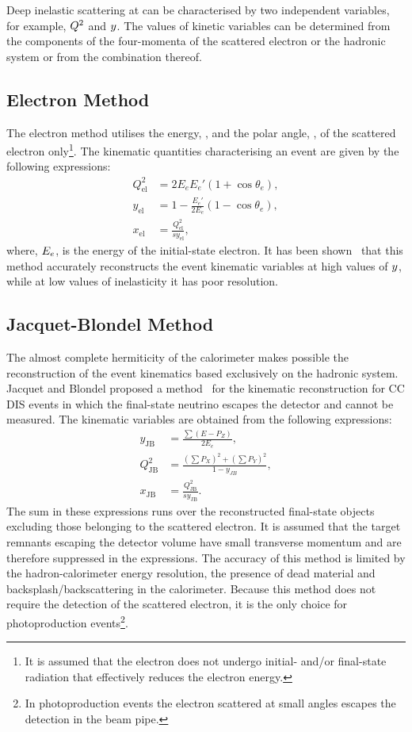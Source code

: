 Deep inelastic scattering at \hera can be characterised by two independent variables, for example, $\mbox{${Q^2}$}$ and $\mbox{${y}$}$. The values of kinetic variables can be determined from the components of the four-momenta of the scattered electron or the hadronic system or from the combination thereof.
\subsection{Electron Method}
\label{subsec:em}
The electron method utilises the energy, \eefin, and the polar angle, \thetae, of the scattered electron only\footnote{It is assumed that the electron does not undergo initial- and/or final-state radiation that effectively reduces the electron energy.}. The kinematic quantities characterising an event are given by the following expressions:
\begin{align}
	Q^2_\text{el} &= 2 E_e E_e' \left( 1 + \cos \theta_e \right),			\label{eq:q2el}							\\
	y_\text{el}      &= 1 - \frac{E_e'}{2 E_e}\left( 1 - \cos \theta_e \right),			\label{eq:yel} \\
	x_\text{el}      &= \frac{Q^2_\text{el}}{s y_\text{el}},			\label{eq:xel}
\end{align}
where, $\mbox{$E_e$}$, is the energy of the initial-state electron. It has been shown~\cite{nim:a426:583} that this method accurately reconstructs the event kinematic variables at high values of $\mbox{${y}$}$, while at low values of inelasticity it has poor resolution.
\subsection{Jacquet-Blondel Method}
\label{subsec:jb}
The almost complete hermiticity of the \zeus calorimeter makes  possible the reconstruction of the event kinematics based exclusively on the hadronic system. Jacquet and Blondel proposed a method~\cite{proc:epfacility:1979:391} for the kinematic reconstruction for CC DIS events in which the final-state neutrino escapes the detector and cannot be measured. The kinematic variables are obtained from the following expressions:
\begin{align}
	y_\text{JB}      &= \frac{\sum{ \left( E - P_{Z} \right) }}{2E_e},			\label{eq:ybj} \\
	Q^2_\text{JB} &= \frac{ \left( \sum{P_{X}} \right)^2 + \left( \sum{P_{Y}} \right)^2 }{1-y_{JB}},			\label{eq:q2jb}							\\
	x_\text{JB}      &= \frac{Q^2_\text{JB}}{s y_\text{JB}}.			\label{eq:xjb}
\end{align}
The sum in these expressions runs over the reconstructed final-state objects excluding those belonging to the scattered electron. It is assumed that the target remnants escaping the detector volume have small transverse momentum and are therefore suppressed in the expressions. The accuracy of this method is limited by the hadron-calorimeter energy resolution, the presence of dead material and backsplash/backscattering in the calorimeter. Because this method does not require the detection of the scattered electron, it is the only choice for photoproduction events\footnote{In photoproduction events the electron scattered at small angles escapes the detection in the beam pipe.}.
